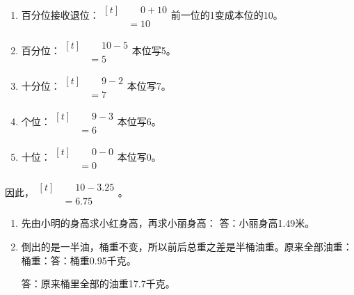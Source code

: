 {\begin{enumerate}[leftmargin=1.7em,itemsep=5pt,topsep=0pt]
\item 百分位接收退位：\(\begin{aligned}[t]&\phantom{={}}0+10\\&=10\end{aligned}\)\quad 前一位的1变成本位的10。
\item 百分位：\(\begin{aligned}[t]&\phantom{={}}10-5\\&=5\end{aligned}\)\quad 本位写5。
\item 十分位：\(\begin{aligned}[t]&\phantom{={}}9-2\\&=7\end{aligned}\)\quad 本位写7。
\item 个位：\(\begin{aligned}[t]&\phantom{={}}9-3\\&=6\end{aligned}\)\quad 本位写6。
\item 十位：\(\begin{aligned}[t]&\phantom{={}}0-0\\&=0\end{aligned}\)\quad 本位写0。
\end{enumerate}
\par\smallskip
因此，\(\begin{aligned}[t]&\phantom{={}}10-3.25\\&=6.75\end{aligned}\)。
\par\medskip


\begin{enumerate}
\item 先由小明的身高求小红身高，再求小丽身高：
答：小丽身高1.49米。
\item 倒出的是一半油，桶重不变，所以前后总重之差是半桶油重。原来全部油重：
桶重：答：桶重0.95千克。

答：原来桶里全部的油重17.7千克。
\end{enumerate}


}

